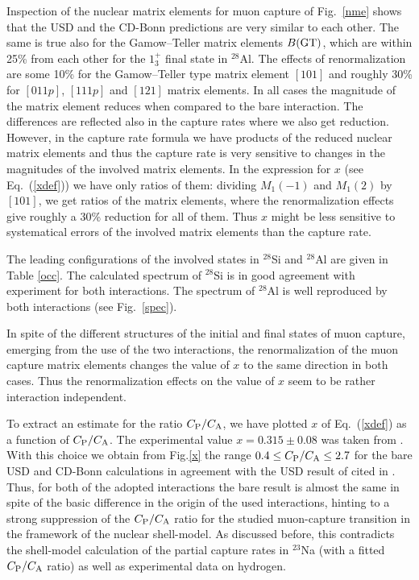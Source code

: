 \begin{multicols}{2}
Inspection of the nuclear matrix elements for muon
capture of Fig.\ \ref{nme} shows
that the USD and the CD-Bonn predictions are very similar to each other. The
same is true also for the Gamow--Teller matrix elements $B({\rm GT})$, which are
within 25\% from each other for the $1^+_3$ final state in ${}^{28}$Al.
The effects of renormalization are some 10\% for the Gamow--Teller type
matrix element $[101]$ and roughly 30\% for $[011p]$,  $[111p]$ and $[121]$
matrix elements. In all cases the magnitude of the matrix element reduces
when compared to the bare interaction.
The differences are reflected also in the capture
rates where we also get reduction.
However, in the capture rate formula \cite{mor} we have products of the reduced nuclear
matrix elements and thus the capture rate is very sensitive to changes in the
magnitudes of the involved matrix elements. In the expression for $x$ (see
Eq.\ (\ref{xdef})) we have only ratios of them: dividing
$M_1(-1)$ and $M_1(2)$ by $[101]$,
we get ratios of the matrix elements, where the renormalization effects
give roughly a 30\% reduction for all of them.
Thus $x$ might be less sensitive to systematical errors of the involved matrix
elements than the capture rate.

The leading configurations of the involved states in $^{28}$Si and $^{28}$Al
are given in Table \ref{occ}.
The calculated spectrum of $^{28}$Si is in good agreement with experiment for
both interactions. The spectrum of $^{28}$Al is well reproduced by both
interactions (see Fig.\ \ref{spec}).

In spite of the different structures of the initial and final states of muon
capture, emerging from the use of the two interactions, the renormalization
of the muon capture matrix elements changes the value of $x$ to the same
direction in both cases. Thus the renormalization effects on the value of
$x$ seem to be rather interaction independent.

To extract an estimate for the ratio $C_{\rm P}/C_{\rm A}$, we have
plotted $x$ of Eq.\ (\ref{xdef}) as a function of $C_{\rm P}/C_{\rm A}$. The
experimental value $x=0.315\pm0.08$ was taken
from \cite{MOF97}. With this choice  we obtain from Fig.\thinspace \ref{x}
the range $0.4\le C_{\rm P}/C_{\rm A}\le 2.7$
for the bare USD and CD-Bonn calculations
in agreement with the USD result of \cite{JUN95} cited in \cite{MOF97}. Thus,
for both of the adopted interactions the bare result is almost the
same in spite of the basic difference in the origin
of the used interactions, hinting to a strong
suppression of the $C_{\rm P}/C_{\rm A}$ ratio for the studied
muon-capture transition in the framework of the nuclear shell-model.
As discussed before, this contradicts the
shell-model calculation of the partial capture rates in
$^{23}$Na (with a fitted $C_{\rm P}/C_{\rm A}$ ratio)
as well as experimental data on hydrogen.


\end{multicols}
